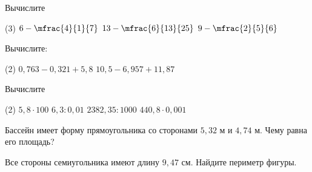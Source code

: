 \begin{homework}[number=3]
	\begin{listofex}
		\item Вычислите 
		\begin{tasks}(3)
			\task \( 6-\mfrac{4}{1}{7} \)
			\task \( 13-\mfrac{6}{13}{25} \)
			\task \( 9-\mfrac{2}{5}{6} \)
		\end{tasks}
		\item Вычислите:
		\begin{tasks}(2)
			\task \( 0,763-0,321+5,8 \)
			\task \( 10,5-6,957+11,87 \)
		\end{tasks}
		\item Вычислите 
		\begin{tasks}(2)
			\task \( 5,8\cdot100 \)
			\task \( 6,3:0,01 \)
			\task \( 2382,35:1000 \)
			\task \( 440,8\cdot0,001 \)
		\end{tasks}
		\item Бассейн имеет форму прямоугольника со сторонами \( 5,32 \) м и \( 4,74 \) м. Чему равна его площадь?
		\item Все стороны семиугольника имеют длину \( 9,47 \) см. Найдите периметр фигуры.
	\end{listofex}
\end{homework}

